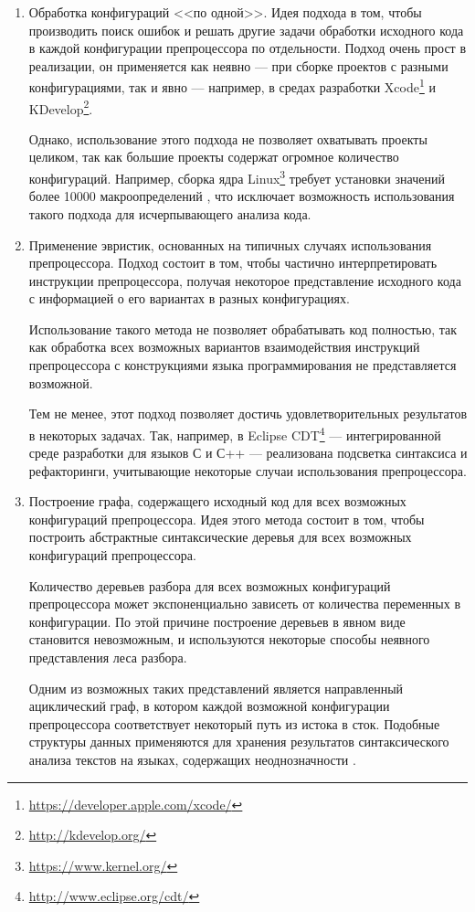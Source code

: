\begin{enumerate}

\item 

Обработка конфигураций <<по одной>>. Идея подхода в том, чтобы производить поиск ошибок и решать другие задачи обработки исходного кода в каждой конфигурации препроцессора по отдельности. Подход очень прост в реализации, он применяется как неявно --- при сборке проектов с разными конфигурациями, так и явно --- например, в средах разработки Xcode\footnote{\url{https://developer.apple.com/xcode/}} и KDevelop\footnote{\url{http://kdevelop.org/}}.

Однако, использование этого подхода не позволяет охватывать проекты целиком, так как большие проекты содержат огромное количество конфигураций. Например, сборка ядра Linux\footnote{\url{https://www.kernel.org/}} требует установки значений более 10000 макроопределений \cite{typechef}, что исключает возможность использования такого подхода для исчерпывающего анализа кода.

\item

Применение эвристик, основанных на типичных случаях использования препроцессора. Подход состоит в том, чтобы частично интерпретировать инструкции препроцессора, получая некоторое представление исходного кода с информацией о его вариантах в разных конфигурациях. 

Использование такого метода не позволяет обрабатывать код полностью, так как обработка всех возможных вариантов взаимодействия инструкций препроцессора с конструкциями языка программирования не представляется возможной.

Тем не менее, этот подход позволяет достичь удовлетворительных результатов в некоторых задачах. Так, например, в Eclipse CDT\footnote{\url{http://www.eclipse.org/cdt/}} --- интегрированной среде разработки для языков С и С++ --- реализована подсветка синтаксиса и рефакторинги, учитывающие некоторые случаи использования препроцессора.

\item

Построение графа, содержащего исходный код для всех возможных конфигураций препроцессора. Идея этого метода состоит в том, чтобы построить абстрактные синтаксические деревья для всех возможных конфигураций препроцессора. 

Количество деревьев разбора для всех возможных конфигураций препроцессора может экспоненциально зависеть от количества переменных в конфигурации. По этой причине построение деревьев в явном виде становится невозможным, и используются некоторые способы неявного представления леса разбора.

Одним из возможных таких представлений является направленный ациклический граф, в котором каждой возможной конфигурации препроцессора соответствует некоторый путь из истока в сток. Подобные структуры данных применяются для хранения результатов синтаксического анализа текстов на языках, содержащих неоднозначности \cite{parseforests}.

\end{enumerate}

